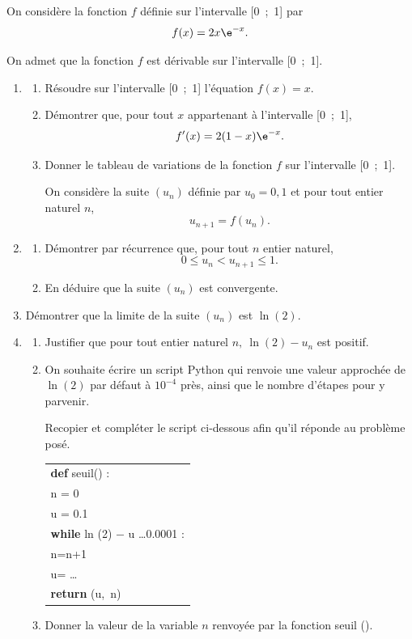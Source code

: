 \medskip

On considère la fonction $f$ définie sur l'intervalle [0~;~1] par 
\[f(x) = 2x\e^{-x}.\]

On admet que la fonction $f$ est dérivable sur l'intervalle [0~;~1]. 

\medskip

\begin{enumerate}
\item 
	\begin{enumerate}
		\item Résoudre sur l'intervalle [0~;~1] l'équation $f(x) = x$.
		\item Démontrer que, pour tout $x$ appartenant à l'intervalle [0~;~1], 
		\[f'(x) = 2(1 - x)\e^{-x}.\]
		
		\item Donner le tableau de variations de la fonction $f$ sur l'intervalle [0~;~1].
		
On considère la suite $\left(u_n\right)$ définie par $u_0 = 0,1$ et pour tout entier naturel $n$,
\[u_{n+1} = f\left(u_n\right).\]
	\end{enumerate}
\item 
	\begin{enumerate}
		\item Démontrer par récurrence que, pour tout $n$ entier naturel,
		\[0 \leqslant u_n < u_{n+1} \leqslant 1.\]
		
		\item En déduire que la suite $\left(u_n\right)$ est convergente.
	\end{enumerate}
\item Démontrer que la limite de la suite $\left(u_n\right)$ est $\ln (2)$.
\item 
	\begin{enumerate}
		\item Justifier que pour tout entier naturel $n,\: \ln (2) - u_n$ est positif.
		\item On souhaite écrire un script Python qui renvoie une valeur approchée de $\ln(2)$ par défaut à $10^{-4}$ près, ainsi que le nombre d'étapes pour y parvenir.
		
Recopier et compléter le script ci-dessous afin qu'il réponde au problème posé.

\begin{center}
\begin{tabular}{|l|}\hline
\textbf{def} seuil() :\\
\qquad n = 0\\
\qquad u = 0.1\\
\qquad \textbf{while} ln (2) $-$ u \ldots 0.0001 :\\
\qquad \qquad n=n+1\\
\qquad \qquad u= \ldots\\
\qquad \textbf{return} (u,~n)\\ \hline
\end{tabular}
\end{center}

		\item Donner la valeur de la variable $n$ renvoyée par la fonction seuil ().
	\end{enumerate}
\end{enumerate}

\medskip
